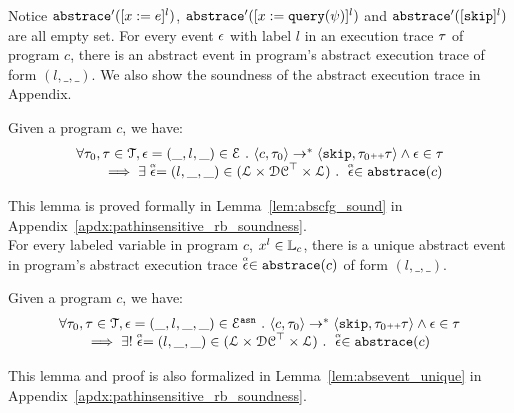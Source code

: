    Notice $\mathtt{abs}{\mathtt{trace}}'([x := e]^{l})$, $\mathtt{abs}{\mathtt{trace}}'([x := {\tt query}(\psi)]^{l})$ and $\mathtt{abs}{\mathtt{trace}}'([\mathtt{skip}]^{l})$ are all empty set. 
   For every event $\mathtt{\epsilon}$ with label $l$ in an execution trace $\mathtt{\tau}$ of program $c$, 
   there is an abstract event in program's abstract execution trace of form $(l, \_, \_)$.  
   We also show the soundness of the abstract execution trace in Appendix.
   \begin{lem}
     \label{lem:abscfg_sound}
   Given a program ${c}$, we have:
   \[
     \begin{array}{l}
       \forall \mathtt{\tau}_0, \mathtt{\tau} \in \mathcal{T} ,  \mathtt{\epsilon} = (\_, l, \_) \in \mathcal{E} ~.~
   \langle {c}, \mathtt{\tau}_0 \rangle \to^{*} \langle \mathtt{skip}, \mathtt{\tau}_0 {\scriptscriptstyle ++} \mathtt{\tau} \rangle 
   \land \mathtt{\epsilon} \in \mathtt{\tau} 
   \\
   \qquad \implies \exists \stackrel{\scriptscriptstyle{\alpha}}{\mathtt{\epsilon}{}} = (l, \_, \_) \in (\mathcal{L}\times \mathcal{DC}^{\top} \times \mathcal{L}) ~.~ 
   \stackrel{\scriptscriptstyle{\alpha}}{\mathtt{\epsilon}{}} \in \mathtt{abs}{\mathtt{trace}}(c)
   \end{array}
   \]
   \end{lem}
This lemma is proved formally in Lemma~\ref{lem:abscfg_sound} in Appendix~\ref{apdx:pathinsensitive_rb_soundness}.
\\
For every labeled variable in program $c$, $x^l \in \mathbb{L}_c$, 
there is a unique abstract event in program's abstract execution trace $\stackrel{\scriptscriptstyle{\alpha}}{\mathtt{\epsilon}{}} \in \mathtt{abs}{\mathtt{trace}}(c)$ of form $(l, \_, \_)$. 
\begin{lem}
  \label{lem:abscfg_unique}
Given a program ${c}$, we have:
%
\[
  \begin{array}{l}
    \forall \mathtt{\tau}_0, \mathtt{\tau} \in \mathcal{T} ,  \mathtt{\epsilon} = (\_, l, \_, \_) \in \mathcal{E}^{\mathtt{{asn}}} ~.~
\langle {c}, \mathtt{\tau}_0 \rangle \to^{*} \langle \mathtt{skip}, \mathtt{\tau}_0 {\scriptscriptstyle ++} \mathtt{\tau} \rangle 
\land \mathtt{\epsilon} \in \mathtt{\tau} 
\\
\qquad \implies \exists! \stackrel{\scriptscriptstyle{\alpha}}{\mathtt{\epsilon}{}} = (l, \_, \_) \in (\mathcal{L}\times \mathcal{DC}^{\top} \times \mathcal{L}) ~.~ 
\stackrel{\scriptscriptstyle{\alpha}}{\mathtt{\epsilon}{}} \in \mathtt{abs}{\mathtt{trace}}(c)
\end{array}
\]
\end{lem}
This lemma and proof is also 
formalized in Lemma~\ref{lem:absevent_unique} in Appendix~\ref{apdx:pathinsensitive_rb_soundness}.

